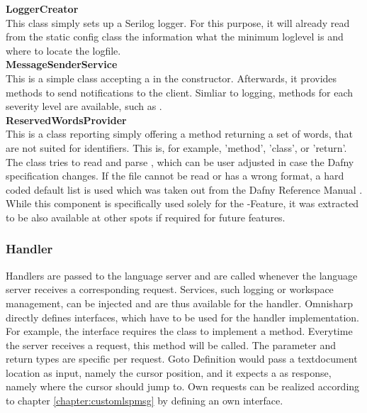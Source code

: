 \textbf{LoggerCreator}\\
This class simply sets up a Serilog \cite{serilog} logger. For this purpose, it will already read from the static config class  the information what the minimum loglevel is and where to locate the logfile.\\

\textbf{MessageSenderService}\\
This is a simple class accepting a  in the constructor.
Afterwards, it provides methods to send notifications to the client.
Simliar to logging, methods for each severity level are available, such as .\\

\textbf{ReservedWordsProvider}\\
This is a class reporting simply offering a method returning a set of words, that are not suited for identifiers.
This is, for example, 'method', 'class', or 'return'.
The class tries to read and parse , which can be user adjusted in case the Dafny specification changes.
If the file cannot be read or has a wrong format, a hard coded default list is used which was taken out from the Dafny Reference Manual \cite{dafnyReferenceManual}.\\

While this component is specifically used solely for the -Feature, it was extracted to be also available at other spots if required for future features.\\

\subsubsection{Handler}
Handlers are passed to the language server and are called whenever the language server receives a corresponding request.
Services, such logging or workspace management, can be injected and are thus available for the handler.
Omnisharp directly defines interfaces, which have to be used for the handler implementation.
For example, the interface  requires the class to implement a  method.
Everytime the server receives a  request, this  method will be called.
The parameter and return types are specific per request.
Goto Definition would pass a textdocument location as input, namely the cursor position, and it expects a  as response, namely where the cursor should jump to.
Own requests can be realized according to chapter \ref{chapter:customlspmsg} by defining an own interface. \\

